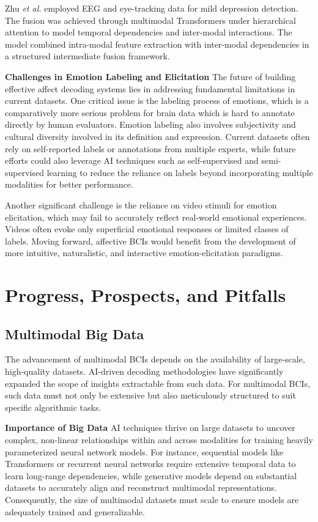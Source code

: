 \documentclass[journal]{IEEEtran}
\begin{document}
Zhu \emph{et al.} \cite{Zhu2025} employed EEG and eye-tracking data for mild depression detection. The fusion was achieved through multimodal Transformers under hierarchical attention to model temporal dependencies and inter-modal interactions. The model combined intra-modal feature extraction with inter-modal dependencies in a structured intermediate fusion framework.

\textbf{Challenges in Emotion Labeling and Elicitation} The future of building effective affect decoding systems lies in addressing fundamental limitations in current datasets. One critical issue is the labeling process of emotions, which is a comparatively more serious problem for brain data which is hard to annotate directly by human evaluators. Emotion labeling also involves subjectivity and cultural diversity involved in its definition and expression. Current datasets often rely on self-reported labels or annotations from multiple experts, while future efforts could also leverage AI techniques such as self-supervised and semi-supervised learning to reduce the reliance on labels beyond incorporating multiple modalities for better performance.

Another significant challenge is the reliance on video stimuli for emotion elicitation, which may fail to accurately reflect real-world emotional experiences. Videos often evoke only superficial emotional responses or limited classes of labels. Moving forward, affective BCIs would benefit from the development of more intuitive, naturalistic, and interactive emotion-elicitation paradigms.

\section{Progress, Prospects, and Pitfalls} \label{sect:prospects}

\subsection{Multimodal Big Data} \label{sect:bigdata}

The advancement of multimodal BCIs depends on the availability of large-scale, high-quality datasets. AI-driven decoding methodologies have significantly expanded the scope of insights extractable from such data. For multimodal BCIs, such data must not only be extensive but also meticulously structured to suit specific algorithmic tasks.

\textbf{Importance of Big Data} AI techniques thrive on large datasets to uncover complex, non-linear relationships within and across modalities for training heavily parameterized neural network models. For instance, sequential models like Transformers or recurrent neural networks require extensive temporal data to learn long-range dependencies, while generative models depend on substantial datasets to accurately align and reconstruct multimodal representations. Consequently, the size of multimodal datasets must scale to ensure models are adequately trained and generalizable.
\end{document}
